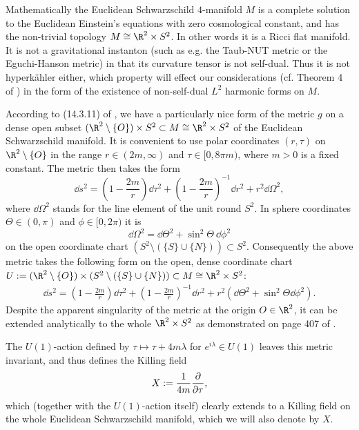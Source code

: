 \documentclass[a4paper,12pt,draft]{article}
\begin{document}
Mathematically the Euclidean Schwarzschild $4$-manifold $M$ 
is a complete solution to the Euclidean Einstein's equations with zero
cosmological constant, and has the non-trivial topology 
$M\cong \R^2\times S^2$. In other words it
is a Ricci flat manifold. It is not a gravitational 
instanton (such as e.g. the Taub-NUT metric or the Eguchi-Hanson metric) in
that its curvature tensor is not self-dual. Thus it is not hyperk\"ahler
either, which property will effect our considerations (cf. Theorem 4 of
\cite{hitchin}) in the form of the existence of non-self-dual 
$L^2$ harmonic forms on $M$.
 
According to (14.3.11) of \cite{wald},  
we have a particularly nice form of the metric $g$ on a dense open subset 
$(\R^2\setminus \{ O\})\times S^2\subset M\cong \R^2\times S^2$ of the
Euclidean Schwarzschild manifold. It is convenient to use polar
coordinates 
$(r,\tau)$ on $\R^2\setminus\{O\}$ in the range $r\in (2m,\infty)$ and 
$\tau\in [0,8\pi m)$, where $m>0$ is a fixed constant. The metric then 
takes the form 
\[\dd s^2=\left( 1-\frac{2m}{r}\right) \dd\tau^2+
\left( 1-\frac{2m}{r}\right)^{-1}\dd r^2+r^2\dd\Omega^2,\]
where $\dd\Omega^2$ stands for the line element of the unit round $S^2$. 
In  sphere coordinates $\Theta\in (0,\pi)$ and $\phi\in [0,2\pi)$ it is 
$$\dd\Omega^2=\dd\Theta^2+\sin^2\Theta\:\dd\phi^2$$ on the open coordinate
chart 
$(S^2\setminus(\{S\}\cup\{ N \} ))\subset S^2$.
Consequently the above metric takes the following form on the open, dense 
coordinate chart 
$U:=(\R^2\setminus\{O\})\times (S^2\setminus(\{S\}\cup\{N\}))\subset 
M\cong \R^2\times S^2$:
\begin{eqnarray} \dd s^2=\left( 1-\frac{2m}{r}\right)\dd\tau^2+
\left( 1-\frac{2m}{r}\right)^{-1}\dd r^2+r^2 (\dd\Theta^2+\sin^2\Theta
\dd\phi^2).
\label{metric}\end{eqnarray}
Despite the apparent singularity of the metric at the origin $ O\in\R^2$,
it can be extended analytically to the whole
$\R^2\times S^2$ as demonstrated on page 407 of \cite{wald}.

The $U(1)$-action defined by $\tau\mapsto \tau + 4m\lambda$ for 
$e^{i\lambda} \in U(1)$ leaves this metric invariant, and thus defines the 
Killing field 
\[ X:={1\over 4m}{\partial\over\partial \tau},\] 
which (together with 
the $U(1)$-action itself) clearly 
extends to a Killing field on the whole Euclidean Schwarzschild manifold,
which we will also denote by $X$. 
\end{document}
